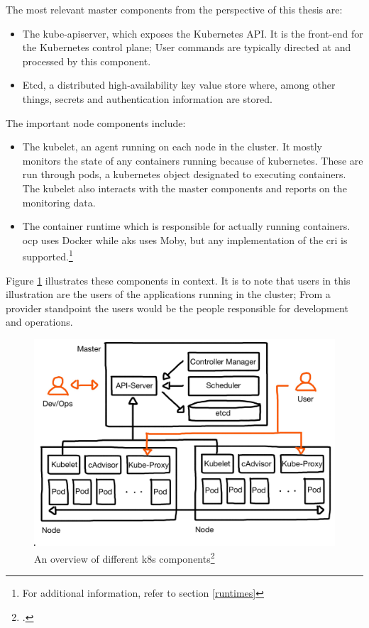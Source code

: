 The most relevant master components from the perspective of this thesis are:
\begin{itemize}

\item The kube-apiserver, which exposes the Kubernetes API. It is the front-end for the Kubernetes control plane; User commands are typically directed at and processed by this component.

\item Etcd, a distributed high-availability key value store where, among other things, secrets and authentication information are stored.

\end{itemize}

The important node components include:
\begin{itemize}

\item The kubelet, an agent running on each node in the cluster. It mostly monitors the state of any containers running because of kubernetes. These are run through pods, a kubernetes object designated to executing containers. The kubelet also interacts with the master components and reports on the monitoring data.

\item The container runtime which is responsible for actually running containers. \gls{ocp} uses Docker while \gls{aks} uses Moby, but any implementation of the \gls{cri} is supported.\footnote{For additional information, refer to section \ref{runtimes}} 

\end{itemize}

Figure \ref{fig:k8s-big-picture} illustrates these components in context. It is to note that users in this illustration are the users of the applications running in the cluster; From a provider standpoint the users would be the people responsible for development and operations.

\begin{figure}[H]
\includegraphics[scale=0.2]{pictures/big-picture.JPG} 
\caption{An overview of different \gls{k8s} components\protect\footcite{nicoPictures}}
\label{fig:k8s-big-picture}
\end{figure}

